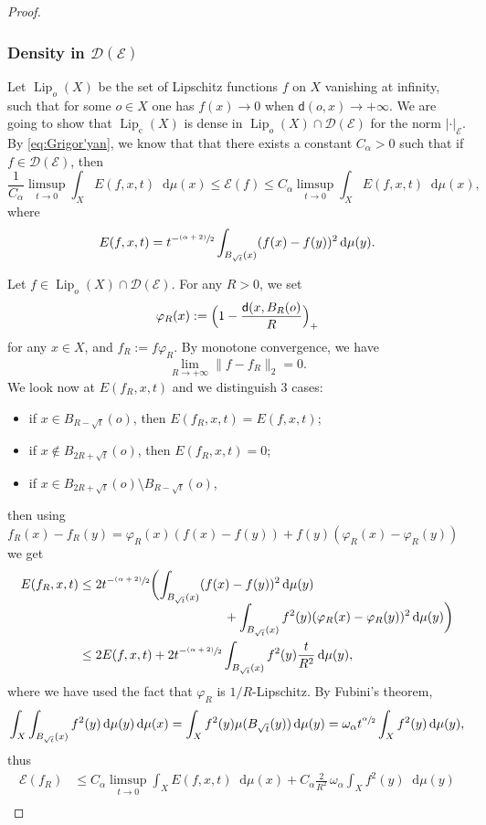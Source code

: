 \documentclass[10pt]{amsart}
\newcommand{\rmc}{\mathrm{c}}
\theoremstyle{plain}
\theoremstyle{definition}
\newcommand{\cE}{\mathcal{E}}
\newcommand{\cD}{\mathcal{D}}
\newcommand{\di}{\mathop{}\!\mathrm{d}}
\DeclareMathOperator{\Lip}{Lip}
\newcommand{\dist}{\mathsf{d}}
\begin{document}
\begin{proof}
\subsubsection*{Density in $\cD(\cE)$} Let $\Lip_o(X)$ be the set of Lipschitz functions $f$ on $X$ vanishing at infinity, \ie such that for some $o \in X$ one has $f(x)\to 0$ when $\dist(o,x)\to+\infty$. We are going to show that $\Lip_\rmc(X)$ is dense in $\Lip_o(X)\cap \cD(\cE)$ for the norm $|\cdot|_{\cE}$. By \eqref{eq:Grigor'yan}, we know that that there exists a constant $C_\alpha>0$ such that if $f\in \cD(\cE)$, then
\[
\frac{1}{C_\alpha}\limsup_{t\to 0}\int_X E(f,x,t)\di\mu(x)\le \cE(f) \le C_\alpha\limsup_{t\to 0}\int_X E(f,x,t)\di\mu(x),
\]
where
\[
E(f,x,t)= t^{-\sfrac{(\alpha+2)}{2}} \int_{B_{\sqrt{t}}(x)}(f(x)-f(y))^2\di \mu(y).
\]

Let $f\in \Lip_o(X)\cap \cD(\cE)$. For any $R>0$, we set
\[
\varphi_R(x):=\Bigl(1-\frac{\dist(x,B_R(o)}{R}\Bigr)_+
\]for any $x \in X$, and $f_R:= f \varphi_R$.
By monotone convergence, we have
\[
\lim_{R\to +\infty} \|f-f_R\|_2=0.
\]
We look now at $E(f_R,x,t)$ and we distinguish 3 cases:
\begin{itemize}
\item if $x\in B_{R-\sqrt{t}}(o)$, then $E(f_R,x,t)=E(f,x,t)$;
\item if $x\not\in B_{2R+\sqrt{t}}(o)$, then $E(f_R,x,t)=0$;
\item if $x\in B_{2R+\sqrt{t}}(o)\setminus B_{R-\sqrt{t}}(o)$,
\end{itemize}
then using $f_R(x)-f_R(y)=\varphi_R(x)(f(x)-f(y))+f(y)(\varphi_R(x)-\varphi_R(y))$ we get
\begin{align*}
E(f_R,x,t)&\le 2 t^{-\sfrac{(\alpha+2)}{2}} \biggl(\int_{B_{\sqrt{t}}(x)}(f(x)-f(y))^2\di \mu(y)\\[-5pt]
&\hspace*{4cm}+\int_{B_{\sqrt{t}}(x)}f^2(y)(\varphi_R(x)-\varphi_R(y))^2\di\mu(y)\biggr)\\
&\le 2E(f,x,t)+ 2 t^{-\sfrac{(\alpha+2)}{2}} \int_{B_{\sqrt{t}}(x)}f^2(y)\frac{t}{R^2}\di\mu(y),
\end{align*}
where we have used the fact that $\varphi_R$ is $1/R$-Lipschitz. By Fubini's theorem,
\[
\int_X \int_{B_{\sqrt{t}}(x)}f^2(y)\di \mu(y) \di \mu(x) = \int_X f^2(y)\mu(B_{\sqrt{t}}(y))\di \mu(y) = \omega_\alpha t^{\sfrac{\alpha}{2}} \int_X f^2(y)\di \mu(y),
\]
thus
\begin{align*}\cE(f_R)&\le C_\alpha \limsup_{t\to 0}\int_{X} E(f,x,t)\di\mu(x)+C_\alpha \frac{2}{R^2}\, \omega_\alpha \int_X f^2(y)\di\mu(y)\\

\end{align*}
\end{proof}
\end{document}
